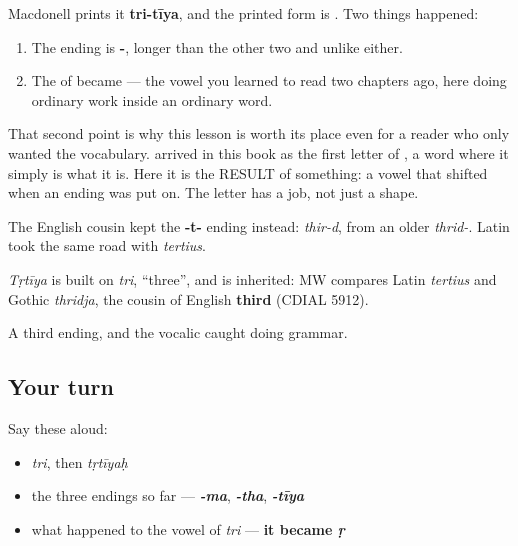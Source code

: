 \begin{cousinweb}
Macdonell prints it \textbf{tri-tīya}, and the printed form is \textbf{}. Two things happened:

\begin{enumerate}
\raggedright
  \item The ending is \textbf{-}, longer than the other two and unlike either.
  \item The \textbf{} of \textbf{} became \textbf{} — the vowel you learned to read two chapters ago, here doing ordinary work inside an ordinary word.
\end{enumerate}

That second point is why this lesson is worth its place even for a reader who only wanted the vocabulary. \textbf{} arrived in this book as the first letter of \textbf{}, a word where it simply is what it is. Here it is the RESULT of something: a vowel that shifted when an ending was put on. The letter has a job, not just a shape.

The English cousin kept the \textbf{-t-} ending instead: \emph{thir-d}, from an older \emph{thrid-}. Latin took the same road with \emph{tertius}.

\emph{Tṛtīya} is built on \emph{tri}, \textquotedblleft{}three\textquotedblright{}, and is inherited: MW compares Latin \emph{tertius} and Gothic \emph{thridja}, the cousin of English \textbf{third} (CDIAL 5912).
\end{cousinweb}

\begin{grammarlens}[title={What you've built}]
A third ending, and the vocalic \textbf{} caught doing grammar.
\end{grammarlens}

\subsection*{Your turn}
Say these aloud:

\begin{itemize}
\raggedright
  \item \emph{tri}, then \emph{tṛtīyaḥ}
  \item the three endings so far — \emph{\textbf{-ma}}, \emph{\textbf{-tha}}, \emph{\textbf{-tīya}}
  \item what happened to the vowel of \emph{tri} — \textbf{it became \emph{ṛ}}
\end{itemize}

